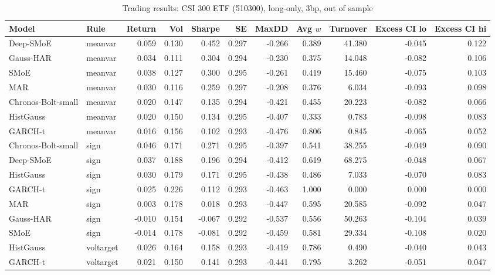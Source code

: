 \begin{table}[!htbp]\centering\scriptsize
\caption{Trading results: CSI 300 ETF (510300), long-only, 3bp, out of sample}\label{tab:econ_etf510300}
\begin{adjustbox}{max width=\textwidth}
\begin{tabular}{llrrrrrrrrr}
\toprule
Model & Rule & Return & Vol & Sharpe & SE & MaxDD & Avg $w$ & Turnover & Excess CI lo & Excess CI hi\\
\midrule
Deep-SMoE & meanvar & 0.059 & 0.130 & 0.452 & 0.297 & -0.266 & 0.389 & 41.380 & -0.045 & 0.122\\
Gauss-HAR & meanvar & 0.034 & 0.111 & 0.304 & 0.294 & -0.230 & 0.375 & 14.048 & -0.082 & 0.106\\
SMoE & meanvar & 0.038 & 0.127 & 0.300 & 0.295 & -0.261 & 0.419 & 15.460 & -0.075 & 0.103\\
MAR & meanvar & 0.030 & 0.116 & 0.259 & 0.297 & -0.208 & 0.376 & 6.034 & -0.093 & 0.098\\
Chronos-Bolt-small & meanvar & 0.020 & 0.147 & 0.135 & 0.294 & -0.421 & 0.455 & 20.223 & -0.082 & 0.066\\
HistGauss & meanvar & 0.020 & 0.150 & 0.134 & 0.295 & -0.407 & 0.333 & 0.783 & -0.098 & 0.083\\
GARCH-t & meanvar & 0.016 & 0.156 & 0.102 & 0.293 & -0.476 & 0.806 & 0.845 & -0.065 & 0.052\\
Chronos-Bolt-small & sign & 0.046 & 0.171 & 0.271 & 0.295 & -0.397 & 0.541 & 38.255 & -0.049 & 0.090\\
Deep-SMoE & sign & 0.037 & 0.188 & 0.196 & 0.294 & -0.412 & 0.619 & 68.275 & -0.048 & 0.067\\
HistGauss & sign & 0.030 & 0.179 & 0.171 & 0.295 & -0.438 & 0.486 & 7.033 & -0.070 & 0.083\\
GARCH-t & sign & 0.025 & 0.226 & 0.112 & 0.293 & -0.463 & 1.000 & 0.000 & 0.000 & 0.000\\
MAR & sign & 0.003 & 0.178 & 0.018 & 0.293 & -0.447 & 0.595 & 20.585 & -0.092 & 0.047\\
Gauss-HAR & sign & -0.010 & 0.154 & -0.067 & 0.292 & -0.537 & 0.556 & 50.263 & -0.104 & 0.039\\
SMoE & sign & -0.014 & 0.178 & -0.081 & 0.292 & -0.459 & 0.581 & 29.334 & -0.108 & 0.020\\
HistGauss & voltarget & 0.026 & 0.164 & 0.158 & 0.293 & -0.419 & 0.786 & 0.490 & -0.040 & 0.043\\
GARCH-t & voltarget & 0.021 & 0.150 & 0.141 & 0.293 & -0.441 & 0.795 & 3.262 & -0.051 & 0.047\\

\end{tabular}
\end{adjustbox}
\end{table}
